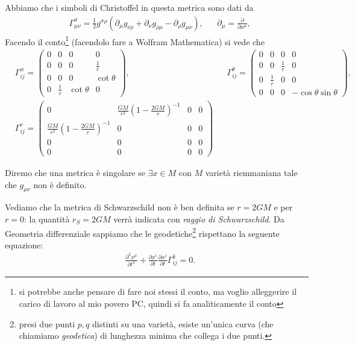 \documentclass[12pt, twoside, italian]{article}
\begin{document}
	Abbiamo che i simboli di Christoffel in questa metrica sono dati da
	\begin{align*}
		&\Gamma^{\sigma}_{\mu \nu} = \frac{1}{2}g^{\sigma \rho}(\partial_{\mu} g_{\nu \rho} + \partial_{\nu} g_{\rho \mu} - \partial_\rho g_{\mu \nu}), &  &\partial_\mu = \frac{\partial}{\partial x^\mu},
	\end{align*}
	Facendo il conto\footnote{si potrebbe anche pensare di fare noi stessi il conto, ma voglio alleggerire il carico di lavoro al mio povero PC, quindi si fa analiticamente il conto} (facendolo fare a Wolfram Mathematica) si vede che
	\begin{align*}
		&\Gamma^\phi_{ij} = \begin{pmatrix}
			0 & 0 & 0 & 0 \\
			0 & 0 & 0 & \frac{1}{r} \\
			0 & 0 & 0 & \cot{\theta} \\
			0 & \frac{1}{r} & \cot{\theta} & 0 
		\end{pmatrix}, & &\Gamma^{\theta}_{ij} = \begin{pmatrix}
			0 & 0 & 0 & 0 \\
			0 & 0 & \frac{1}{r} & 0 \\
			0 & \frac{1}{r} & 0 & 0 \\
			0 & 0 & 0 & -\cos{\theta}\sin{\theta}
		\end{pmatrix}, \\
		&\Gamma^{r}_{ij} = \begin{pmatrix}
			0 & \frac{GM}{r^2}(1-\frac{2GM}{r})^{-1} & 0 & 0 \\
			\frac{GM}{r^2}(1-\frac{2GM}{r})^{-1} & 0 & 0 & 0 \\
			0 & 0 & 0 & 0 \\
			0 & 0 & 0 & 0
		\end{pmatrix}
	\end{align*}
	\begin{definition}
		Diremo che una metrica è singolare se $\exists x \in M$ con $M$ varietà riemmaniana tale che $g_{\mu \nu}$ non è definito.
	\end{definition}
	Vediamo che la metrica di Schwarzschild non è ben definita se $r = 2GM$ e per $r = 0$: la quantità $r_S = 2GM$ verrà indicata con \emph{raggio di Schwarzschild}.
	Da Geometria differenziale sappiamo che le geodetiche\footnote{presi due punti $p, q$ distinti su una varietà, esiste un'unica curva (che chiamiamo \emph{geodetica}) di lunghezza minima che collega i due punti.} rispettano la seguente equazione:
	\begin{align}
		&\frac{\partial^2 x^\mu}{\partial t^2} + \frac{\partial x^i}{\partial t} \frac{\partial x^j}{\partial t} \Gamma^k_{ij} = 0.
	\end{align}
\end{document}
